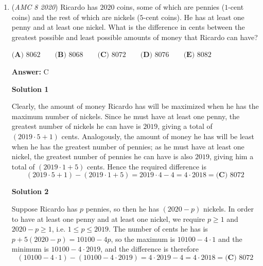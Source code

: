 \begin{enumerate}
 



\textbf{Solution 2 (without using the "choose" function)}

As in Solution 1, we find that the first two digits must be $23$, and the third digit must be at least $4$ because the digits can not repeat. If it is $4$, then there are $5$ choices for the last digit, namely $5$, $6$, $7$, $8$, or $9$. Similarly, if the third digit is $5$, there are $4$ choices for the last digit, namely $6$, $7$, $8$, and $9$; if $6$, there are $3$ choices; if $7$, there are $2$ choices; and if $8$, there is $1$ choice. It follows that the total number of such integers is $5+4+3+2+1=\boxed{\textbf{(C) }15}$.

 


	\item (\textit{AMC 8 2020}) Ricardo has $2020$ coins, some of which are pennies ($1$-cent coins) and the rest of which are nickels ($5$-cent coins). He has at least one penny and at least one nickel. What is the difference in cents between the greatest possible and least possible amounts of money that Ricardo can have?


 $\textbf{(A) }\text{8062} \qquad \textbf{(B) }\text{8068} \qquad \textbf{(C) }\text{8072} \qquad \textbf{(D) }\text{8076}\qquad \textbf{(E) }\text{8082}$

 \textbf{Answer: }C



\textbf{Solution 1}

Clearly, the amount of money Ricardo has will be maximized when he has the maximum number of nickels. Since he must have at least one penny, the greatest number of nickels he can have is $2019$, giving a total of $(2019\cdot 5 + 1)$ cents. Analogously, the amount of money he has will be least when he has the greatest number of pennies; as he must have at least one nickel, the greatest number of pennies he can have is also $2019$, giving him a total of $(2019\cdot 1 + 5)$ cents. Hence the required difference is 
 \[(2019\cdot 5 + 1)-(2019\cdot 1 + 5)=2019\cdot 4-4=4\cdot 2018=\boxed{\textbf{(C) }8072}\]




\textbf{Solution 2}

Suppose Ricardo has $p$ pennies, so then he has $(2020-p)$ nickels. In order to have at least one penny and at least one nickel, we require $p \geq 1$ and $2020 - p \geq 1$, i.e. $1 \leq p \leq 2019$. The number of cents he has is $p+5(2020-p) = 10100-4p$, so the maximum is $10100-4 \cdot 1$ and the minimum is $10100 - 4 \cdot 2019$, and the difference is therefore 
 \[(10100 - 4\cdot 1) - (10100 - 4\cdot 2019) = 4\cdot 2019 - 4 = 4\cdot 2018 = \boxed{\textbf{(C) }8072}\]




\end{enumerate}

